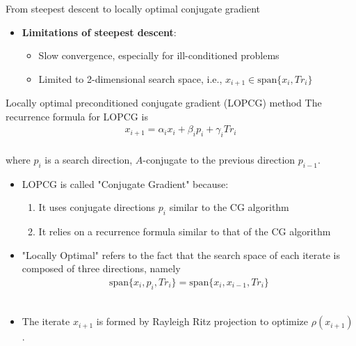 \documentclass[t,usepdftitle=false]{beamer}
\begin{document}
\begin{frame}{From steepest descent to locally optimal conjugate gradient}
\begin{itemize}
\item \textbf{Limitations of steepest descent}:
\begin{itemize}\normalsize
\item[-] Slow convergence, especially for ill-conditioned problems\vspace{.07cm}
\item[-] Limited to 2-dimensional search space, i.e., $x_{i+1}\in\text{span}\{x_i, Tr_i\}$
\end{itemize}
\end{itemize}
\vspace{-.05cm}
\begin{block}{Locally optimal preconditioned conjugate gradient (LOPCG) method}
The recurrence formula for LOPCG is\vspace{-.3cm}
\begin{align*}
x_{i+1} = \alpha_i x_i + \beta_i p_i + \gamma_i Tr_i
\end{align*}
\vspace{-.8cm}\\
where $p_i$ is a search direction, $A$-conjugate to the previous direction $p_{i-1}$.
\begin{itemize}
\item LOPCG is called "Conjugate Gradient" because:
\begin{enumerate}\normalsize
\item It uses conjugate directions $p_i$ similar to the CG algorithm\vspace{.07cm}
\item It relies on a recurrence formula similar to that of the CG algorithm
\end{enumerate}
\item "Locally Optimal" refers to the fact that the search space of each iterate is composed of three directions, namely\vspace{-.3cm}
\begin{align*}
\text{span}\{x_i, p_i, Tr_i\}=\text{span}\{x_i,x_{i-1}, Tr_i\}
\end{align*}
\vspace{-.8cm}\\
\item The iterate $x_{i+1}$ is formed by Rayleigh Ritz projection to optimize $\rho(x_{i+1})$.
\end{itemize}
\end{block}
\end{frame}
	
\end{document}
